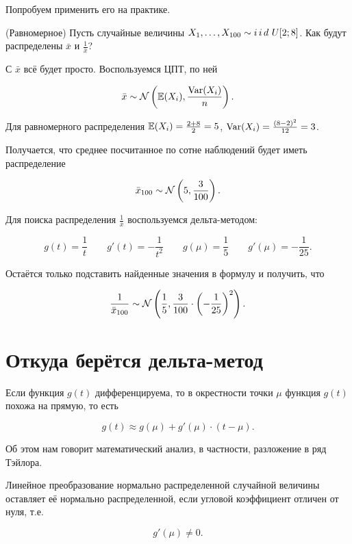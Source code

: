 \documentclass[12pt, a4paper, oneside]{article}
\begin{document}
Попробуем применить его на практике. 

\begin{problem}{(Равномерное)}
Пусть случайные величины $X_1, \ldots, X_{100} \sim i\,i\,d\,\, U[2;8]$. Как будут распределены $\bar{x}$ и $\frac{1}{\bar{x}}$? 
\end{problem} 

\begin{sol}
С $\bar{x}$ всё будет просто. Воспользуемся ЦПТ, по ней 

$$
\bar{x}\sim \mathcal{N} \left( \mathbb{E}(X_i), \frac{\operatorname{Var}(X_i)}{n} \right).
$$

Для равномерного распределения $\mathbb{E}(X_i) = \frac{2 + 8}{2} = 5$, $\operatorname{Var}(X_i) = \frac{(8-2)^2}{12} = 3$.

Получается, что среднее посчитанное по сотне наблюдений будет иметь распределение 

$$
\bar{x}_{100} \sim \mathcal{N} \left( 5, \frac{3}{100} \right).
$$

Для поиска распределения $\frac{1}{\bar{x}}$ воспользуемся дельта-методом: 

$$
g(t) = \frac{1}{t} \qquad g'(t) = -\frac{1}{t^2} \qquad g(\mu) = \frac{1}{5} \qquad g'(\mu) = - \frac{1}{25}.
$$

Остаётся только подставить  найденные значения в формулу и получить, что 

$$
\frac{1}{\bar{x}_{100}} \sim \mathcal{N} \left( \frac{1}{5}, \frac{3}{100} \cdot \left(-\frac{1}{25} \right)^2\right).
$$
\end{sol}









\section*{Откуда берётся дельта-метод}

Если функция $g(t)$ дифференцируема, то в окрестности точки $\mu$ функция $g(t)$ похожа на прямую, то есть 

$$
g(t) \approx g(\mu) + g'(\mu) \cdot (t - \mu).
$$

Об этом нам говорит математический анализ, в частности, разложение в ряд Тэйлора. 

Линейное преобразование нормально распределенной случайной величины оставляет её нормально распределенной, если угловой коэффициент отличен от нуля, т.е. 

$$
g'(\mu) \neq 0.
$$ 
\end{document}
